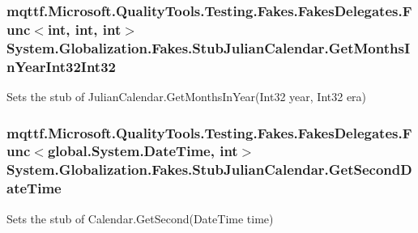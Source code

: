 \hypertarget{class_system_1_1_globalization_1_1_fakes_1_1_stub_julian_calendar_a7c6297c1fe530398bbebff59c48616b9}{
\subsubsection[{Get\-Months\-In\-Year\-Int32\-Int32}]{\setlength{\rightskip}{0pt plus 5cm}mqttf.\-Microsoft.\-Quality\-Tools.\-Testing.\-Fakes.\-Fakes\-Delegates.\-Func$<$int, int, int$>$ System.\-Globalization.\-Fakes.\-Stub\-Julian\-Calendar.\-Get\-Months\-In\-Year\-Int32\-Int32}}\label{class_system_1_1_globalization_1_1_fakes_1_1_stub_julian_calendar_a7c6297c1fe530398bbebff59c48616b9}


Sets the stub of Julian\-Calendar.\-Get\-Months\-In\-Year(\-Int32 year, Int32 era)

\hypertarget{class_system_1_1_globalization_1_1_fakes_1_1_stub_julian_calendar_a950724e57a0562c3e4818f4822f2bde7}{
\subsubsection[{Get\-Second\-Date\-Time}]{\setlength{\rightskip}{0pt plus 5cm}mqttf.\-Microsoft.\-Quality\-Tools.\-Testing.\-Fakes.\-Fakes\-Delegates.\-Func$<$global.\-System.\-Date\-Time, int$>$ System.\-Globalization.\-Fakes.\-Stub\-Julian\-Calendar.\-Get\-Second\-Date\-Time}}\label{class_system_1_1_globalization_1_1_fakes_1_1_stub_julian_calendar_a950724e57a0562c3e4818f4822f2bde7}


Sets the stub of Calendar.\-Get\-Second(\-Date\-Time time)

